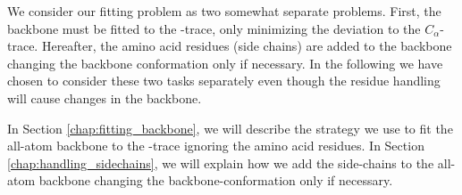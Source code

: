 We consider our fitting problem as two somewhat separate problems.
First, the backbone must be fitted to the \Ca-trace, only minimizing
the deviation to the $C_{\alpha}$-trace.  Hereafter, the amino acid
residues (side chains) are added to the backbone changing the backbone
conformation only if necessary.  In the following we have chosen to
consider these two tasks separately even though the residue handling
will cause changes in the backbone.

In Section \ref{chap:fitting_backbone}, we will describe the strategy we use to fit the all-atom backbone to the \Ca-trace ignoring the amino acid residues.
In Section \ref{chap:handling_sidechains}, we will explain how we add the side-chains to the all-atom backbone changing the backbone-conformation only if necessary.

